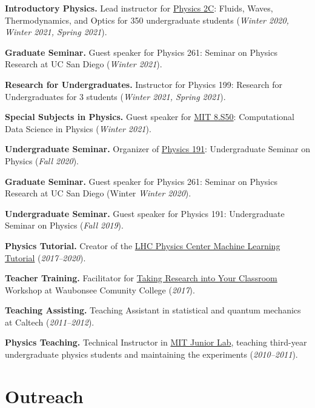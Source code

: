 \documentclass[11pt]{res}
\newcommand{\MarginText}[1]{\section{#1}\vspace{10pt}}
\begin{document}
\begin{resume}
  \textbf{Introductory Physics.} Lead instructor for \href{https://jduarte.physics.ucsd.edu/phys2c/index.html}{Physics 2C}: Fluids, Waves, Thermodynamics, and Optics for 350 undergraduate students (\textit{Winter 2020, Winter 2021, Spring 2021}).

  \textbf{Graduate Seminar.} Guest speaker for Physics 261: Seminar on Physics Research at UC San Diego (\textit{Winter 2021}).

  \textbf{Research for Undergraduates.} Instructor for Physics 199: Research for Undergraduates for 3 students (\textit{Winter 2021, Spring 2021}).

  \textbf{Special Subjects in Physics.} Guest speaker for \href{https://github.com/violatingcp/MIT_8.S50}{MIT 8.S50}: Computational Data Science in Physics (\textit{Winter 2021}).

  \textbf{Undergraduate Seminar.} Organizer of \href{https://indico.cern.ch/event/956641/}{Physics 191}: Undergraduate Seminar on Physics (\textit{Fall 2020}).

  \textbf{Graduate Seminar.} Guest speaker for Physics 261: Seminar on Physics Research at UC San Diego (Winter \textit{Winter 2020}).

  \textbf{Undergraduate Seminar.} Guest speaker for Physics 191: Undergraduate Seminar on Physics (\textit{Fall 2019}).

  \textbf{Physics Tutorial.} Creator of the \href{https://github.com/FNALLPC/machine-learning-hats}{LHC Physics Center Machine Learning Tutorial} (\textit{2017--2020}).

  \textbf{Teacher Training.} Facilitator for \href{http://eddata.fnal.gov/lasso/program_search/show_workshopID_new.lasso?event_id=435}{Taking Research into Your Classroom} Workshop at Waubonsee Comunity College (\textit{2017}).

  \textbf{Teaching Assisting.} Teaching Assistant in statistical and quantum mechanics at Caltech (\textit{2011--2012}).

  \textbf{Physics Teaching.} Technical Instructor in \href{http://web.mit.edu/8.13/www/index.shtml}{MIT Junior Lab}, teaching third-year undergraduate physics students and maintaining the experiments (\textit{2010--2011}).


  \MarginText{Outreach}


\end{resume}
\end{document}
